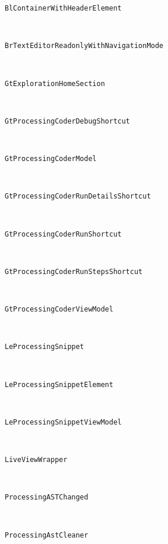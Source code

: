 \begin{description}

\item[\texttt{BlContainerWithHeaderElement}] \hfill \\
	
\item[\texttt{BrTextEditorReadonlyWithNavigationMode}] \hfill \\
	
\item[\texttt{GtExplorationHomeSection}] \hfill \\
	
\item[\texttt{GtProcessingCoderDebugShortcut}] \hfill \\
	
\item[\texttt{GtProcessingCoderModel}] \hfill \\
	
\item[\texttt{GtProcessingCoderRunDetailsShortcut}] \hfill \\
	
\item[\texttt{GtProcessingCoderRunShortcut}] \hfill \\
	
\item[\texttt{GtProcessingCoderRunStepsShortcut}] \hfill \\
	
\item[\texttt{GtProcessingCoderViewModel}] \hfill \\
	
\item[\texttt{LeProcessingSnippet}] \hfill \\
	
\item[\texttt{LeProcessingSnippetElement}] \hfill \\
	
\item[\texttt{LeProcessingSnippetViewModel}] \hfill \\
	
\item[\texttt{LiveViewWrapper}] \hfill \\
	
\item[\texttt{ProcessingASTChanged}] \hfill \\
	
\item[\texttt{ProcessingAstCleaner}] \hfill \\
	

\end{description}
